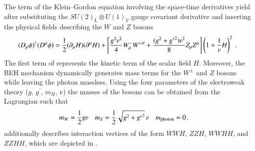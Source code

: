 The term of the Klein--Gordon equation involving the space-time derivatives
yield after substituting the $SU(2)_{\text{L}} \otimes U(1)_Y$ gauge covariant
derivative and inserting the physical fields describing the $W$ and $Z$ bosons
\begin{align}
  (D_\mu \phi)^\dagger (D^\mu \phi) =
  \frac{1}{2} (\partial_\mu H) (\partial^\mu H)
  + \left[
  \frac{g^2 \varv^2}{4} W^{-}_\mu {W^{+}}^\mu
  +
  \frac{(g^2 + {g^\prime}^2) \varv^2}{8} Z_\mu Z^\mu
  \right] \left( 1 + \frac{1}{\varv} H \right)^2 \,\text{.}
  \label{eq:higgs_covariant_derivative}
\end{align}
The first term of  represents the kinetic
term of the scalar field $H$. Moreover, the BEH mechanism dynamically generates
mass terms for the $W^\pm$ and $Z$ bosons while leaving the photon
massless. Using the four parameters of the electroweak theory ($g$, $g^\prime$,
$m_{H}$, $\varv$) the masses of the bosons can be obtained from the Lagrangian
such that
\begin{align*}
  &m_W = \frac{1}{2} g \varv  &&m_Z = \frac{1}{2} \sqrt{g^2 + {g^\prime}^2} \, \varv && m_{\text{photon}} = 0 \,\text{.}
\end{align*}
 additionally describes interaction vertices
of the form $WWH$, $ZZH$, $WWHH$, and $ZZHH$, which are depicted in
.

